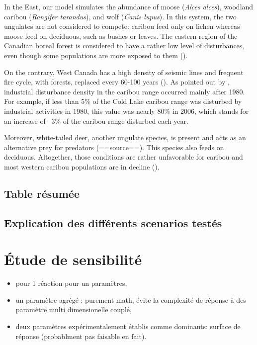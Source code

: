 In the East, our model simulates the abundance of moose (\textit{Alces alces}), woodland caribou (\textit{Rangifer tarandus}), and wolf (\textit{Canis lupus}). In this system, the two ungulates are not considered to compete: caribou feed only on lichen whereas moose feed on deciduous, such as bushes or leaves. The eastern region of the Canadian boreal forest is considered to have a rather low level of disturbances, even though some populations are more exposed to them (\cite{johnson2019}).

On the contrary, West Canada has a high density of seismic lines and frequent fire cycle, with forests, replaced every 60-100 years (\cite{johnson2019, stewart2020}). As pointed out by \cite{stewart2020}, industrial disturbance density in the caribou range occurred mainly after 1980. For example, if less than 5\% of the Cold Lake caribou range was disturbed by industrial activities in 1980, this value was nearly 80\% in 2006, which stands for an increase of ~3\% of the caribou range disturbed each year.

Moreover, white-tailed deer, another ungulate species, is present and acts as an alternative prey for predators (==source==). This species also feeds on deciduous. Altogether, those conditions are rather unfavorable for caribou and most western caribou populations are in decline (\cite{stewart2020}).


\subsection{Table résumée}


\subsection{Explication des différents scenarios testés}


\section{Étude de sensibilité }
\begin{itemize}
    \item pour 1 réaction pour un paramètres,
    \item un paramètre agrégé : purement math, évite la complexité de réponse à des paramètre multi dimensionelle couplé,
    \item deux paramètres expérimentalement établis comme dominants: surface de réponse (probablment pas faisable en fait).
\end{itemize}
